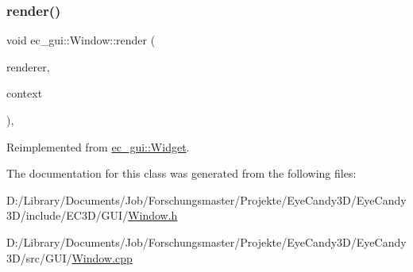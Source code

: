 \subsubsection{\texorpdfstring{render()}{render()}}
{\footnotesize\ttfamily void ec\+\_\+gui\+::\+Window\+::render (\begin{DoxyParamCaption}\item[{\mbox{\hyperlink{classec__gui_1_1_gui_renderer}{Gui\+Renderer}} \&}]{renderer,  }\item[{\mbox{\hyperlink{classec__gui_1_1_gui_rendering_context}{Gui\+Rendering\+Context}} \&}]{context }\end{DoxyParamCaption})\hspace{0.3cm}{\ttfamily [override]}, {\ttfamily [virtual]}}



Reimplemented from \mbox{\hyperlink{classec__gui_1_1_widget_ade9b99741eb922b24f8328509483f129}{ec\+\_\+gui\+::\+Widget}}.



The documentation for this class was generated from the following files\+:\begin{DoxyCompactItemize}
\item 
D\+:/\+Library/\+Documents/\+Job/\+Forschungsmaster/\+Projekte/\+Eye\+Candy3\+D/\+Eye\+Candy3\+D/include/\+E\+C3\+D/\+G\+U\+I/\mbox{\hyperlink{_g_u_i_2_window_8h}{Window.\+h}}\item 
D\+:/\+Library/\+Documents/\+Job/\+Forschungsmaster/\+Projekte/\+Eye\+Candy3\+D/\+Eye\+Candy3\+D/src/\+G\+U\+I/\mbox{\hyperlink{_g_u_i_2_window_8cpp}{Window.\+cpp}}\end{DoxyCompactItemize}
